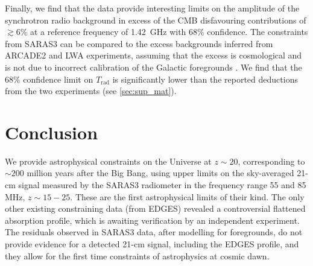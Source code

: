 Finally, we find that the data provide interesting limits on the amplitude of the synchrotron radio background in excess of the CMB disfavouring contributions  of $\gtrsim6$\% at a reference frequency of 1.42~GHz with 68\% confidence. The constraints from SARAS3 can be compared to the excess backgrounds inferred from ARCADE2 \cite{fixsen_arcade_2011} and LWA \cite{dowell_radio_2018} experiments, assuming that the excess is cosmological and is not due to incorrect calibration of the Galactic foregrounds \cite{Subrahmanyan2013}. We find that the 68\% confidence limit on $T_\mathrm{rad}$ is significantly lower than the reported deductions from the two experiments (see \cref{sec:sup_mat}).

\section{Conclusion}\label{sec:saras3_conclusions}

We provide astrophysical constraints on the Universe at $z\sim 20$, corresponding to $\sim 200$ million years after the Big Bang, using upper limits on the sky-averaged 21-cm signal measured by the SARAS3 radiometer in the frequency range 55 and 85 MHz, $z\sim 15-25$. These are the first astrophysical limits of their kind. The only other existing constraining data (from EDGES) revealed a controversial flattened absorption profile, which is awaiting verification by an independent experiment. The residuals observed in SARAS3 data, after modelling for foregrounds, do not provide evidence for a detected 21-cm signal, including the EDGES profile, and they allow for the first time constraints of astrophysics at cosmic dawn.

